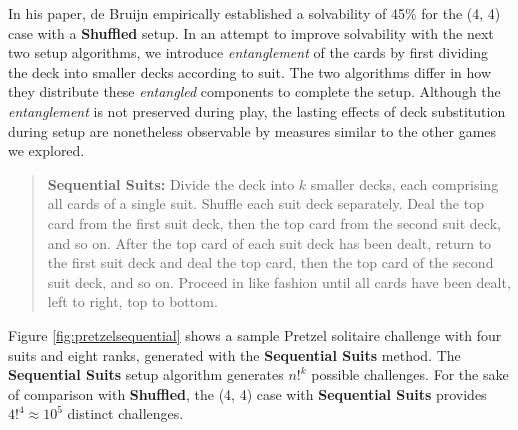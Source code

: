 \documentclass[journal]{IEEEtran}
\begin{document}
In his paper, de Bruijn empirically established a solvability of 45\% for the (4, 4) case with a \textbf{Shuffled} setup. In an attempt to improve solvability with the next two setup algorithms, we introduce \textit{entanglement} of the cards by first dividing the deck into smaller decks according to suit. The two algorithms differ in how they distribute these \textit{entangled} components to complete the setup. Although the \textit{entanglement} is not preserved during play, the lasting effects of deck substitution during setup are nonetheless observable by measures similar to the other games we explored.




\begin{quote}
    {\bf Sequential Suits:} Divide the deck into $k$ smaller decks, each comprising all cards of a single suit. Shuffle each suit deck separately. Deal the top card from the first suit deck, then the top card from the second suit deck, and so on.  After the top card of each suit deck has been dealt, return to the first suit deck and deal the top card, then the top card of the second suit deck, and so on. Proceed in like fashion until all cards have been dealt, left to right, top to bottom.
\end{quote}

Figure \ref{fig:pretzelsequential} shows a sample Pretzel solitaire challenge with four suits and eight ranks, generated with the \textbf{Sequential Suits} method. The \textbf{Sequential Suits} setup algorithm generates $n!^{k}$ possible challenges. For the sake of comparison with \textbf{Shuffled}, the (4, 4) case with \textbf{Sequential Suits} provides $4!^{4} \approx 10^{5}$ distinct challenges.
\end{document}
